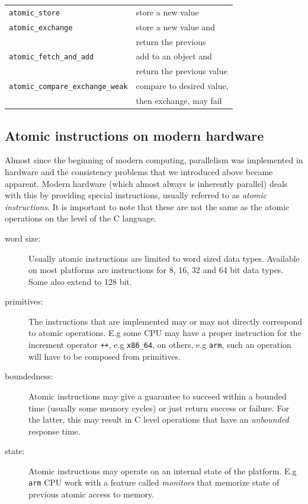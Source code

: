 \documentclass{sig-alternate-05-2015}
\begin{document}
\begin{center}
\begin{tabular}{ll}
\texttt{atomic\_store} & store a new value\\
\texttt{atomic\_exchange} & store a new value and\\
 & return the previous\\
\texttt{atomic\_fetch\_and\_add} & add to an object and\\
 & return the previous value\\
\texttt{atomic\_compare\_exchange\_weak} & compare to desired value,\\
 & then exchange, may fail\\
\end{tabular}
\end{center}




\subsection{Atomic instructions on modern hardware}
\label{sec-2-2}

Almost since the beginning of modern computing, parallelism was
implemented in hardware and the consistency problems that we
introduced above became apparent. Modern hardware (which almost
always is inherently parallel) deals with this by providing special
instructions, usually referred to as \emph{atomic instructions}. It is
important to note that these are not the same as the atomic
operations on the level of the C language.\vspace*{-2ex}

\begin{description}
\item[{word size:}] Usually atomic instructions are limited to word
sized data types. Available on most platforms are
instructions for 8, 16, 32 and 64 bit
data types. Some also extend to 128 bit.\vspace*{-2ex}
\item[{primitives:}] The instructions that are implemented may or may
not directly correspond to atomic operations. E.g
some CPU may have a proper instruction for the
increment operator \texttt{++}, e.g \texttt{x86\_64}, on others,
e.g \texttt{arm}, such an operation will have to be
composed from primitives.\vspace*{-2ex}
\item[{boundedness:}] Atomic instructions may give a guarantee to
succeed within a bounded time (usually some
memory cycles) or just return success or
failure. For the latter, this may result in C
level operations that have an \emph{unbounded}
response time.\vspace*{-2ex}
\item[{state:}] Atomic instructions may operate on an internal state of
the platform. E.g \texttt{arm} CPU work with a feature called
\emph{monitors} that memorize state of previous atomic
access to memory.\vspace*{-2ex}
\end{description}
\end{document}
